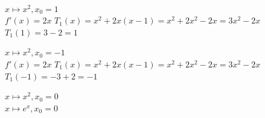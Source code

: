 \documentclass[12pt]{article}
\begin{document}
 \\


 $x \mapsto x^2, x_0 = 1$ \\
$f'(x) = 2x$
$T_1(x) = x^2 + 2x(x-1) = x^2 + 2x^2 - 2x = 3x^2 - 2x$
$T_1(1) = 3 - 2 = 1$



 $x \mapsto x^2, x_0 = -1$\\
$f'(x) = 2x$
$T_1(x) = x^2 + 2x(x-1) = x^2 + 2x^2 - 2x = 3x^2 - 2x$
$T_1(-1) = -3 + 2 = -1$



 $x \mapsto x^2, x_0 = 0$\\

 $x \mapsto e^x, x_0 = 0$\\



 \\

 \\
\end{document}
